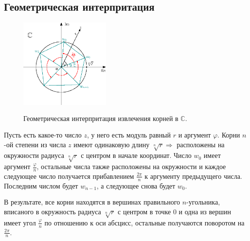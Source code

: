 \documentclass[12pt]{article}
\newcommand{\MC}{\mathbb{C}}
\theoremstyle{definition}
\begin{document}
\subsection*{Геометрическая интерпритация}
\begin{figure}[H]
	\centering
	\includegraphics[width=0.4\textwidth]{AL1L14_3.eps}
	\label{AL1L14_3}
	\caption{Геометрическая интерпритация извлечения корней в $\MC$.}
\end{figure}

Пусть есть какое-то число $z$, у него есть модуль равный $r$ и аргумент $\varphi$. Корни $n$-ой степени из числа $z$ имеют одинаковую длину $\sqrt[n]{r} \Rightarrow$ расположены на окружности радиуса $\sqrt[n]{r}$ с центром в начале координат. Число $w_0$ имеет аргумент $\tfrac{\varphi}{n}$, остальные числа также расположены на окружности и каждое следующее число получается прибавлением $\tfrac{2\pi}{n}$ к аргументу предыдущего числа. Последним числом будет $w_{n-1}$, а следующее снова будет $w_0$. 

В результате, все корни находятся в вершинах правильного $n$-угольника, вписаного в окружность радиуса $\sqrt[n]{r}$ с центром в точке $0$ и одна из вершин имеет угол $\tfrac{\varphi}{n}$ по отношению к оси абсцисс, остальные получаются поворотом на $\tfrac{2\pi}{n}$.
\end{document}
